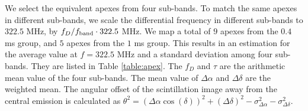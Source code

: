\documentclass[useAMS,usenatbib]{mn2e}
\begin{document}
We select the equivalent apexes from four sub-bands. To match the same apexes in different sub-bands, we scale the differential frequency in different sub-bands to $322.5$ MHz, by $f_D/f_{\rm band}\cdot322.5$ MHz. We map
a total of $9$ apexes from the $0.4$ ms group, and $5$ apexes from the $1$ ms
group. This results in an estimation
for the average value at $f=322.5$ MHz and a standard deviation among four sub-bands. They are listed in Table
\ref{table:apex}. The $f_D$ and $\tau$ are the arithmetic mean value of the four sub-bands. 
The mean value of $\Delta\alpha$ and $\Delta\delta$ are the weighted mean.
The angular offset of the scintillation image away from the central
emission is calculated as
${\theta}^2=({\Delta\alpha}\cos(\delta))^2+({\Delta\delta})^2-\sigma^2_{\Delta\alpha}-\sigma^2_{\Delta\delta}$. 
\end{document}
